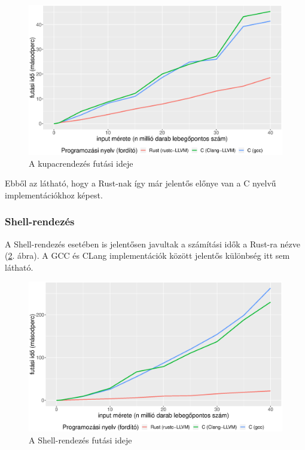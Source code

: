 \begin{figure}[h!]
\centering
\includegraphics[width=15.5cm]{kepek/heap_sort_run_without_read.eps}
\caption{A kupacrendezés futási ideje}
\label{fig:heap_fixed}
\end{figure}

Ebből az látható, hogy a Rust-nak így már jelentős előnye van a C nyelvű implementációkhoz képest.

\subsubsection{Shell-rendezés}

A Shell-rendezés esetében is jelentősen javultak a számítási idők a Rust-ra nézve (\ref{fig:shell_fixed}. ábra). A GCC és CLang implementációk között jelentős különbség itt sem látható.

\begin{figure}[h!]
\centering
\includegraphics[width=15.5cm]{kepek/shells_sort_run_without_read.eps}
\caption{A Shell-rendezés futási ideje}
\label{fig:shell_fixed}
\end{figure}

